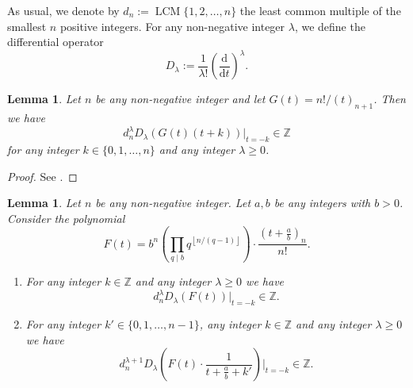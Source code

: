 \documentclass[12pt]{article}
\newtheorem{lemma}[theorem]{Lemma}
\numberwithin{equation}{section}
\begin{document}
\bigskip

As usual, we denote by $d_n := \operatorname{LCM}\{1,2,\ldots,n\}$ the least common multiple of the smallest $n$ positive integers. For any non-negative integer $\lambda$, we define the differential operator
\[D_{\lambda}:=\frac{1}{\lambda !} \left(\frac{\mathrm{d}}{\mathrm{d}t}\right)^{\lambda}.\] 

\begin{lemma}\label{lemma_G(t)}
Let $n$ be any non-negative integer and let $G(t)=n!/(t)_{n+1}$. Then we have
\[ d_n^{\lambda} D_{\lambda}\left( G(t)(t+k) \right)\big|_{t=-k} \in \mathbb{Z} \]
for any integer $k \in \{0,1,\ldots,n\}$ and any integer $\lambda \geqslant 0$.
\end{lemma}

\begin{proof}
See \cite[Lemma 16]{Zud2004}.
\end{proof}


\begin{lemma}\label{lemma_F(t)}
Let $n$ be any non-negative integer. Let $a,b$ be any integers with $b>0$. Consider the polynomial
\[ F(t) = b^{n}\left(\prod_{q \mid b} q^{\left\lfloor n/(q-1) \right\rfloor} \right)\cdot \frac{\left(t+ \frac{a}{b} \right)_{n}}{n!}.  \]
\begin{enumerate}
\item[(1)] For any integer $k \in \mathbb{Z}$ and any integer $\lambda \geqslant 0$ we have
\[ d_n^{\lambda} D_{\lambda} (F(t)) \big|_{t=-k} \in \mathbb{Z}. \]
\item[(2)] For any integer $k' \in \{0,1,\ldots,n-1\}$, any integer $k \in \mathbb{Z}$ and any integer $\lambda \geqslant 0$ we have
\[ d_n^{\lambda+1} D_{\lambda} \left(F(t)\cdot\frac{1}{t+\frac{a}{b}+k'}\right) \Bigg|_{t=-k} \in \mathbb{Z}. \]
\end{enumerate}

\end{lemma}
\end{document}
